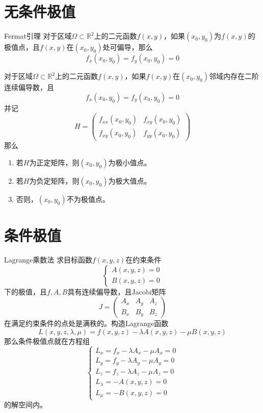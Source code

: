 \documentclass[lang = cn, scheme = chinese, thmcnt = section]{elegantbook}
\newcommand{\R}{\mathbb{R}}            %
\newcommand{\sub}{\subset}             %
\begin{document}
\section{无条件极值}

\begin{theorem}{Fermat引理}
	对于区域$\Omega\sub\R^2$上的二元函数$f(x,y)$，如果$(x_0,y_0)$为$f(x,y)$的极值点，且$f(x,y)$在$(x_0,y_0)$处可偏导，那么
	$$
	f_x(x_0,y_0)=f_y(x_0,y_0)=0
	$$
\end{theorem}

\begin{theorem}
	对于区域$\Omega\sub\R^2$上的二元函数$f(x,y)$，如果$f(x,y)$在$(x_0,y_0)$邻域内存在二阶连续偏导数，且
	$$
	f_x(x_0,y_0)=f_y(x_0,y_0)=0
	$$
	并记
	$$
	H=\begin{pmatrix}
		f_{xx}(x_0,y_0) & f_{xy}(x_0,y_0)\\
		f_{xy}(x_0,y_0) & f_{yy}(x_0,y_0)
	\end{pmatrix}
	$$
	那么
	\begin{enumerate}
		\item 若$H$为正定矩阵，则$(x_0,y_0)$为极小值点。
		\item 若$H$为负定矩阵，则$(x_0,y_0)$为极大值点。
		\item 否则，$(x_0,y_0)$不为极值点。
	\end{enumerate}
\end{theorem}

\section{条件极值}

\begin{theorem}{Lagrange乘数法}
	求目标函数$f(x,y,z)$在约束条件
	$$
	\begin{cases}
		A(x,y,z)=0\\
		B(x,y,z)=0
	\end{cases}
	$$
	下的极值，且$f,A,B$具有连续偏导数，且Jacobi矩阵
	$$
	J=\begin{pmatrix}
		A_x & A_y & A_z\\
		B_x & B_y & B_z
	\end{pmatrix}
	$$
	在满足约束条件的点处是满秩的。构造Lagrange函数
	$$
	L(x,y,z,\lambda,\mu)=f(x,y,z)-\lambda A(x,y,z)-\mu B(x,y,z)
	$$
	那么条件极值点就在方程组
	$$
	\begin{cases}
		L_x=f_x-\lambda A_x-\mu A_x=0\\
		L_y=f_y-\lambda A_y-\mu A_y=0\\
		L_z=f_z-\lambda A_z-\mu A_z=0\\
		L_\lambda = -A(x,y,z)=0\\
		L_\mu = -B(x,y,z)=0
	\end{cases}
	$$
	的解空间内。
\end{theorem}
\end{document}
